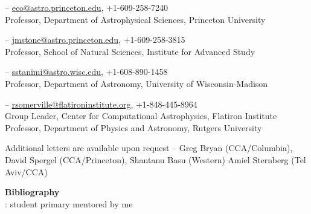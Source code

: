 \documentclass[12pt,preprint,letterpaper]{aastex62}
\begin{document}
\subtitle{Eve Ostriker} --
\url{eco@astro.princeton.edu}, +1-609-258-7240\\
Professor, Department of Astrophysical Sciences, Princeton University

\subtitle{James Stone} --
\url{jmstone@astro.princeton.edu}, +1-609-258-3815\\
Professor, School of Natural Sciences, Institute for Advanced Study

\subtitle{Snezana Stanimirovi\'c} --
\url{sstanimi@astro.wisc.edu}, +1-608-890-1458\\
Professor, Department of Astronomy, University of Wisconsin-Madison

\subtitle{Rachel Somerville} --
\url{rsomerville@flatironinstitute.org}, +1-848-445-8964\\
Group Leader, Center for Computational Astrophysics, Flatiron Institute\\
Professor, Department of Physics and Astronomy, Rutgers University



Additional letters are available upon request -- 
Greg Bryan (CCA/Columbia),
David Spergel (CCA/Princeton),
Shantanu Basu (Western)
Amiel Sternberg (Tel Aviv/CCA)

%
\clearpage
\begin{center}
{\huge \bf Bibliography}\\
{: student primary mentored by me}\\

\end{center}
\end{document}
